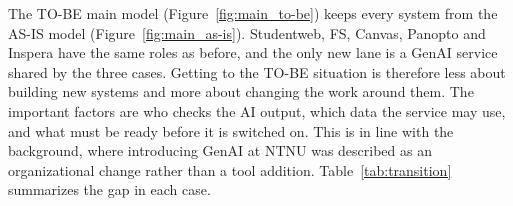 \label{sec:asis-tobe}

The TO-BE main model (Figure~\ref{fig:main_to-be}) keeps every system from the AS-IS model (Figure~\ref{fig:main_as-is}). Studentweb, FS, Canvas, Panopto and Inspera have the same roles as before, and the only new lane is a GenAI service shared by the three cases. Getting to the TO-BE situation is therefore less about building new systems and more about changing the work around them. The important factors are who checks the AI output, which data the service may use, and what must be ready before it is switched on. This is in line with the background, where introducing GenAI at NTNU was described as an organizational change rather than a tool addition. Table~\ref{tab:transition} summarizes the gap in each case.

